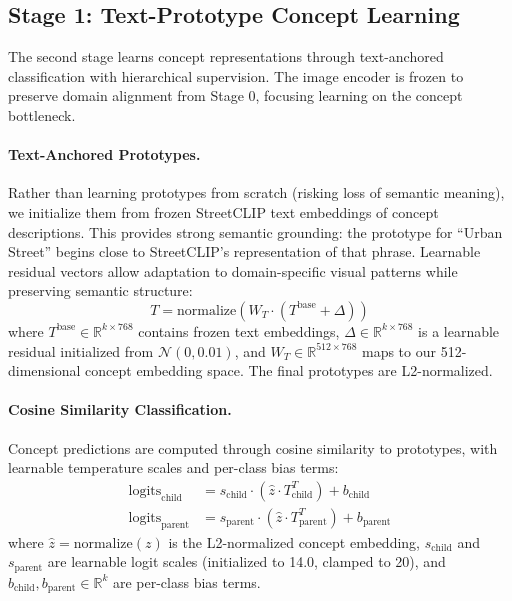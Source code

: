 \documentclass{uva-inf-article}
\begin{document}
\subsection{Stage 1: Text-Prototype Concept Learning}

The second stage learns concept representations through text-anchored classification with hierarchical supervision. The image encoder is frozen to preserve domain alignment from Stage 0, focusing learning on the concept bottleneck.

\paragraph{Text-Anchored Prototypes.}
Rather than learning prototypes from scratch (risking loss of semantic meaning), we initialize them from frozen StreetCLIP text embeddings of concept descriptions. This provides strong semantic grounding: the prototype for ``Urban Street'' begins close to StreetCLIP's representation of that phrase. Learnable residual vectors allow adaptation to domain-specific visual patterns while preserving semantic structure:
\begin{equation}
T = \text{normalize}(W_T \cdot (T^{\text{base}} + \Delta))
\end{equation}
where $T^{\text{base}} \in \mathbb{R}^{k \times 768}$ contains frozen text embeddings, $\Delta \in \mathbb{R}^{k \times 768}$ is a learnable residual initialized from $\mathcal{N}(0, 0.01)$, and $W_T \in \mathbb{R}^{512 \times 768}$ maps to our 512-dimensional concept embedding space. The final prototypes are L2-normalized.

\paragraph{Cosine Similarity Classification.}
Concept predictions are computed through cosine similarity to prototypes, with learnable temperature scales and per-class bias terms:
\begin{align}
\text{logits}_{\text{child}} &= s_{\text{child}} \cdot (\hat{z} \cdot T_{\text{child}}^T) + b_{\text{child}} \\
\text{logits}_{\text{parent}} &= s_{\text{parent}} \cdot (\hat{z} \cdot T_{\text{parent}}^T) + b_{\text{parent}}
\end{align}
where $\hat{z} = \text{normalize}(z)$ is the L2-normalized concept embedding, $s_{\text{child}}$ and $s_{\text{parent}}$ are learnable logit scales (initialized to 14.0, clamped to 20), and $b_{\text{child}}, b_{\text{parent}} \in \mathbb{R}^k$ are per-class bias terms.
\end{document}
